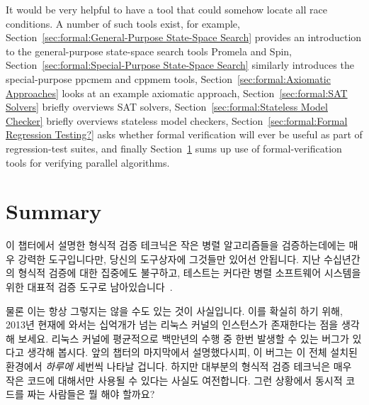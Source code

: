 It would be very helpful to have a tool that could somehow locate
all race conditions.
A number of such tools exist, for example,
Section~\ref{sec:formal:General-Purpose State-Space Search} provides an
introduction to the general-purpose state-space search tools Promela and Spin,
Section~\ref{sec:formal:Special-Purpose State-Space Search}
similarly introduces the special-purpose ppcmem and cppmem tools,
Section~\ref{sec:formal:Axiomatic Approaches}
looks at an example axiomatic approach,
Section~\ref{sec:formal:SAT Solvers}
briefly overviews SAT solvers,
Section~\ref{sec:formal:Stateless Model Checker}
briefly overviews stateless model checkers,
Section~\ref{sec:formal:Formal Regression Testing?}
asks whether formal verification will ever be useful as part of
regression-test suites,
and finally
Section~\ref{sec:formal:Summary}
sums up use of formal-verification tools for verifying parallel algorithms.
\fi









\section{Summary}
\label{sec:formal:Summary}

이 챕터에서 설명한 형식적 검증 테크닉은 작은 병렬 알고리즘들을 검증하는데에는
매우 강력한 도구입니다만, 당신의 도구상자에 그것들만 있어선 안됩니다.
지난 수십년간의 형식적 검증에 대한 집중에도 불구하고, 테스트는 커다란 병렬
소프트웨어 시스템을 위한 대표적 검증 도구로
남아있습니다~\cite{JonathanCorbet2006lockdep,DaveJones2011Trinity}.
\iffalse

The formal-verification techniques described in this chapter
are very powerful tools for validating small
parallel algorithms, but they should not be the only tools in your toolbox.
Despite decades of focus on formal verification, testing remains the
validation workhorse for large parallel software
systems~\cite{JonathanCorbet2006lockdep,DaveJones2011Trinity,PaulEMcKenney2016Formal}.
\fi

물론 이는 항상 그렇지는 않을 수도 있는 것이 사실입니다.
이를 확실히 하기 위해, 2013년 현재에 와서는 십억개가 넘는 리눅스 커널의
인스턴스가 존재한다는 점을 생각해 보세요.
리눅스 커널에 평균적으로 백만년의 수행 중 한번 발생할 수 있는 버그가 있다고
생각해 봅시다.
앞의 챕터의 마지막에서 설명했다시피, 이 버그는 이 전체 설치된 환경에서
\emph{하루에} 세번씩 나타날 겁니다.
하지만 대부분의 형식적 검증 테크닉은 매우 작은 코드에 대해서만 사용될 수 있다는
사실도 여전합니다.
그런 상황에서 동시적 코드를 짜는 사람들은 뭘 해야 할까요?
\iffalse

